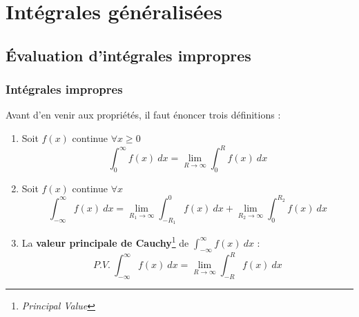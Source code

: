 \chapter{Intégrales généralisées}
\section{Évaluation d'intégrales impropres}
\subsection{Intégrales impropres}
Avant d'en venir aux propriétés, il faut énoncer trois définitions :
\begin{enumerate}
	\item Soit $f(x)$ continue $\forall x \geq0$
	      \begin{equation}
	      	\int_0^\infty f(x)\ dx = \lim\limits_{R\rightarrow\infty}\int_0^R f(x)\
	      	dx
	      \end{equation}
	      	
	\item Soit $f(x)$ continue $\forall x$
	      \begin{equation}
	      	\int_{-\infty}^\infty f(x)\ dx = \lim\limits_{R_1\rightarrow\infty} \int_{-R_1}^0 f(x)\ 
	      	dx + \lim\limits_{R_2\rightarrow\infty} \int^{R_2}_0 f(x)\ 	dx
	      	\label{eq:DecompoInt}
	      \end{equation}
	      	
	\item La \textbf{valeur principale de Cauchy}\footnote{\textit{Principal Value}} de 
	      $\int_{-\infty}^\infty f(x)\ dx$ :
	      \begin{equation}
	      	P.V.\ \int_{-\infty}^\infty f(x)\ dx = \lim\limits_{R\rightarrow\infty} \int_{-R}^R f(x)\ 
	      	dx
	      \end{equation}
\end{enumerate}
	
	
